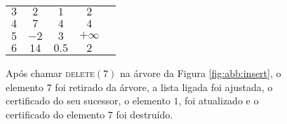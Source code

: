 \begin{figure}[htb]
\begin{tabular}{|c|c|c|c|c|}
        $3$ & $2$ & $1$ & $2$ \\

        $4$ & $7$ & $4$ & $4$ \\

        $5$ & $-2$ & $3$ & $+\infty$ \\

        $6$ & $14$ & $0.5$ & $2$ \\
        \hline
    \end{tabular}
    \caption[ABB após chamar \textsc{delete}]{Após chamar
    \textsc{delete}$(7)$ na árvore da Figura \ref{fig:abb:insert}, o
    elemento $7$ foi retirado da árvore, a lista ligada foi
    ajustada, o certificado do seu sucessor, o elemento $1$, foi
    atualizado e o certificado do elemento $7$ foi destruído.}
    \label{fig:abb:delete}
\end{figure}